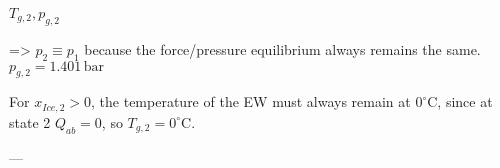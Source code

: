 \( T_{g,2}, p_{g,2} \)  

=> \( p_2 \equiv p_1 \) because the force/pressure equilibrium always remains the same.  
\( p_{g,2} = 1.401 \, \text{bar} \)  

For \( x_{Ice,2} > 0 \), the temperature of the EW must always remain at \( 0^\circ \text{C} \), since at state 2 \( Q_{ab} = 0 \), so \( T_{g,2} = 0^\circ \text{C} \).  

---